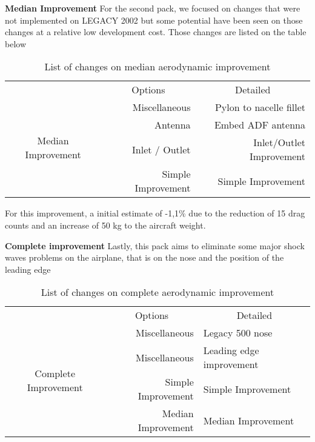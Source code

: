 \textbf{Median Improvement}
For the second pack, we focused on changes that were not implemented on LEGACY 2002 but some potential have been seen on those changes at a relative low development cost. Those changes are listed on the table below

\begin{table}[htbp]
  \centering
  \scriptsize
  \caption{List of changes on median aerodynamic improvement}
    \begin{tabular}{crr}
    \toprule
    \multirow{2}[2]{*}{} & \multicolumn{1}{c}{\multirow{2}[2]{*}{Options}} & \multicolumn{1}{c}{\multirow{2}[2]{*}{Detailed}} \\
    
          & \multicolumn{1}{c}{} & \multicolumn{1}{c}{} \\
          \midrule
    \multirow{4}[8]{*}{Median Improvement} & Miscellaneous & Pylon to nacelle fillet \\
          & Antenna & Embed ADF antenna \\
          & Inlet / Outlet & Inlet/Outlet Improvement \\
          & Simple Improvement & Simple Improvement \\
    \bottomrule
    \end{tabular}%
  \label{tab:changesmedian}%
\end{table}%

For this improvement, a initial estimate of -1,1\% due to the reduction of 15 drag counts and an increase of 50 kg to the aircraft weight.



\textbf{Complete improvement}
Lastly, this pack aims to eliminate some major shock waves problems on the airplane, that is on the nose and the position of the leading edge

\begin{table}[htbp]
  \centering
  \scriptsize
  \caption{List of changes on complete aerodynamic improvement}
    \begin{tabular}{crp{4cm}}
    \toprule
    \multirow{2}[2]{*}{} & \multicolumn{1}{c}{\multirow{2}[2]{*}{Options}} & \multicolumn{1}{c}{\multirow{2}[2]{*}{Detailed}} \\
   
          & \multicolumn{1}{c}{} & \multicolumn{1}{c}{} \\
           \midrule
    \multirow{4}[8]{*}{Complete Improvement} & Miscellaneous & Legacy 500 nose \\
          & Miscellaneous & Leading edge improvement \\
          & Simple Improvement & Simple Improvement \\
          & Median Improvement & Median Improvement \\
    \bottomrule
    \end{tabular}%
  \label{tab:changescomplete}%
\end{table}%

